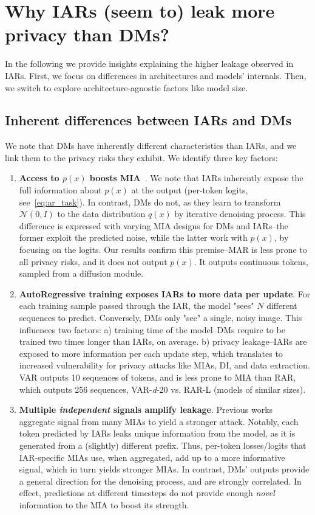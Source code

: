 \appendix
\onecolumn

\section{Why IARs (seem to) leak more privacy than DMs?}
\label{app:why_iars_leak_more}

{In the following we provide insights explaining the higher leakage observed in IARs. First, we focus on differences in architectures and models' internals. Then, we switch to explore architecture-agnostic factors like model size.}

\subsection{Inherent differences between IARs and DMs}
{We note that DMs have inherently different characteristics than IARs, and we link them to the privacy risks they exhibit. We identify three key factors:
\begin{enumerate}
    \item \textbf{Access to $p(x)$ boosts MIA}~\citep{rmia}. We note that IARs inherently expose the full information about $p(x)$ at the output (per-token logits, see~\cref{eq:ar_task}). In contrast, DMs do not, as they learn to transform $\mathcal{N}(0,I)$ to the data distribution $q(x)$ by iterative denoising process. This difference is expressed with varying MIA designs for DMs and IARs--the former exploit the predicted noise, while the latter work with $p(x)$, by focusing on the logits. Our results confirm this premise--MAR is less prone to all privacy risks, and it does not output $p(x)$. It outputs continuous tokens, sampled from a diffusion module.
    \item \textbf{AutoRegressive training exposes IARs to more data per update}. For each training sample passed through the IAR, the model "sees" $N$ different sequences to predict. Conversely, DMs only "see" a single, noisy image. This influences two factors: a) training time of the model--DMs require to be trained two times longer than IARs, on average. b) privacy leakage--IARs are exposed to more information per each update step, which translates to increased vulnerability for privacy attacks like MIAs, DI, and data extraction. VAR outputs 10 sequences of tokens, and is less prone to MIA than RAR, which outputs 256 sequences, \eg VAR-\textit{d}-20 vs. RAR-L (models of similar sizes).
    \item \textbf{Multiple \textit{independent} signals amplify leakage}. Previous works~\citep{maini2024llmdatasetinferencedid,dubinski2024cdicopyrighteddataidentification} aggregate signal from many MIAs to yield a stronger attack. Notably, each token predicted by IARs leaks unique information from the model, as it is generated from a (slightly) different prefix. Thus, per-token losses/logits that IAR-specific MIAs use, when aggregated, add up to a more informative signal, which in turn yields stronger MIAs. In contrast, DMs' outputs provide a general direction for the denoising process, and are strongly correlated. In effect, predictions at different timesteps do not provide enough \textit{novel} information to the MIA to boost its strength.
\end{enumerate}
}

